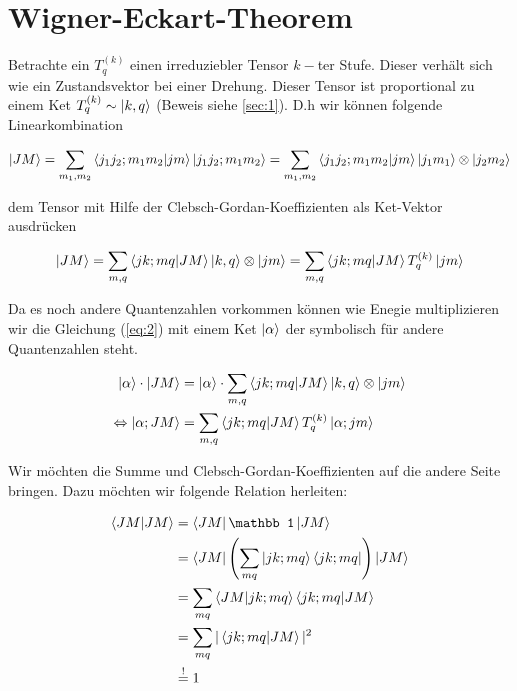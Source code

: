 
\usepackage{amsmath} 





\section*{Wigner-Eckart-Theorem}


Betrachte ein \(T^{(k)}_q\) einen irreduziebler Tensor \(k-\)ter Stufe. Dieser verhält sich wie ein Zustandsvektor bei einer Drehung. Dieser Tensor ist proportional zu einem Ket \(T^{(k)}_q \sim \left| k,q \right\rangle \) (Beweis siehe \ref{sec:1}). D.h wir können folgende Linearkombination

\begin{equation}
  \label{eq:1}
  \ket{JM} = \sum_{m_1,m_2}\braket{j_1j_2;m_1m_2}{jm}\ket{j_1j_2;m_1m_2} = \sum_{m_1,m_2}\braket{j_1j_2;m_1m_2}{jm}\ket{j_1m_1} \otimes \ket{j_2m_2}
\end{equation}

dem Tensor  mit Hilfe der Clebsch-Gordan-Koeffizienten als Ket-Vektor ausdrücken

\begin{equation}
  \label{eq:2}
  \ket{JM} = \sum_{m,q} \braket{jk;mq}{JM} \ket{k,q}\otimes\ket{jm} =  \sum_{m,q} \braket{jk;mq}{JM} T^{(k)}_q  \ket{jm} 
\end{equation}


Da es noch andere Quantenzahlen vorkommen können wie Enegie multiplizieren wir die Gleichung (\ref{eq:2}) mit einem Ket \(\left| \alpha \right\rangle\) der symbolisch für andere Quantenzahlen steht.

\begin{align}
  \label{eq:3}
  \ket{\alpha}\cdot\ket{JM} &=  \ket{\alpha}\cdot\sum_{m,q} \braket{jk;mq}{JM} \ket{k,q}\otimes\ket{jm}\notag \\
\Leftrightarrow \ket{\alpha; JM} &=  \sum_{m,q} \braket{jk;mq}{JM} T^{(k)}_q  \ket{\alpha;jm} 
\end{align}

Wir möchten die Summe und  Clebsch-Gordan-Koeffizienten auf die andere Seite bringen. Dazu möchten wir folgende Relation herleiten:

\begin{align*}
  \label{eq:4}
 \braket{JM}{JM} &= \bra{JM} \mathbb 1 \ket{JM} \\
&= \bra{JM} \left( \sum_{mq}\ket{jk;mq}\bra{jk;mq}  \right) \ket{JM} \\
&=  \sum_{mq}\braket{JM}{jk;mq}\braket{jk;mq}{JM} \\
&=  \sum_{mq}|\braket{jk;mq}{JM} |^2\\
&\stackrel{!}= 1
\end{align*}

